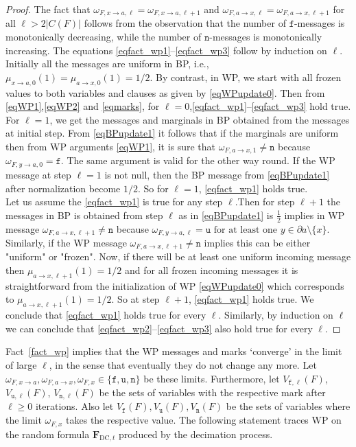 \documentclass[10pt,reqno]{amsart}
\numberwithin{equation}{section}
\renewcommand{\vec}[1]{\boldsymbol{#1}}
\newcommand{\FDC}[1]{\PHI_{\mathrm{DC},{#1}}}
\newcommand{\frozen}{\mathtt{f}}
\newcommand{\unfrozen}{\mathtt{u}}
\newcommand{\nll}{\mathtt{n}}
\newcommand{\fzn}{\frozen}
\newcommand{\uzn}{\unfrozen}
\newcommand\PHI{\vec F}
\begin{document}
\begin{proof}
	The fact that $\omega_{F,x\to a,\ell}=\omega_{F,x\to a,\ell+1}$ and $\omega_{F,a\to x,\ell}=\omega_{F,a\to x,\ell+1}$ for all $\ell>2|C(F)|$ follows from the observation that the number of $\fzn$-messages is monotonically decreasing, while the number of $\nll$-messages is monotonically increasing.
	The equations \eqref{eqfact_wp1}--\eqref{eqfact_wp3} follow by induction on $\ell$.
	Initially all the messages are uniform in BP, i.e., $\mu_{x\to a,0}(1)=\mu_{a\to x,0}(1)=1/2$. By contrast, in WP, we start with all frozen values to both variables and clauses as given by \eqref{eqWPupdate0}. 
	Then from \eqref{eqWP1},\eqref{eqWP2} and \eqref{eqmarks}, for $\ell=0$,\eqref{eqfact_wp1}--\eqref{eqfact_wp3} hold true.
		For $\ell=1$, we get the messages and marginals in BP obtained from the messages at initial step. From \eqref{eqBPupdate1} it follows that if the marginals are uniform then from WP arguments \eqref{eqWP1}, it is sure that $\omega_{F,a\to x,1}\neq \nll$ because $\omega_{F,y\to a,0}=\fzn$.
The same argument is valid for the other way round. If the WP message at step $\ell=1$ is not null, then the BP message from \eqref{eqBPupdate1} after normalization become $1/2$. So for $\ell=1$, \eqref{eqfact_wp1} holds true.\\
		Let us assume the \eqref{eqfact_wp1} is true for any step $\ell$.Then for step $\ell+1$ the messages in BP is obtained from step $\ell$ as in \eqref{eqBPupdate1} is $\frac{1}{2}$ implies in WP message $\omega_{F,a\to x,\ell+1}\neq \nll$ because $\omega_{F,y\to a,\ell}=\uzn \mbox{ for at least one }y\in\partial a\setminus\{x\}$. Similarly, if the WP message $\omega_{F,a\to x,\ell+1}\neq \nll$ implies this can be either "uniform" or "frozen". Now, if there will be at least one uniform incoming message then $\mu_{a\to x,\ell+1}(1)=1/2$ and for all frozen incoming messages it is straightforward from the initialization of WP \eqref{eqWPupdate0} which corresponds to $\mu_{a\to x,\ell+1}(1)=1/2$. So at step $\ell+1$, \eqref{eqfact_wp1} holds true.
		We conclude that \eqref{eqfact_wp1} holds true for every $\ell$. 
		Similarly, by induction on $\ell$ we can conclude that \eqref{eqfact_wp2}--\eqref{eqfact_wp3} also hold true for every $\ell$.
\end{proof}

Fact~\ref{fact_wp} implies that the WP messages and marks `converge' in the limit of large $\ell$, in the sense that eventually they do not change any more.
Let $\omega_{F,x\to a},\omega_{F,a\to x},\omega_{F,x}\in\{\fzn,\uzn,\nll\}$ be these limits.
Furthermore, let $V_{\fzn,\ell}(F)$, $V_{\uzn,\ell}(F)$, $V_{\nll,\ell}(F)$ be the sets of variables with the respective mark after $\ell\geq0$ iterations. 
Also let $V_{\fzn}(F),V_{\uzn}(F),V_{\nll}(F)$ be the sets of variables where the limit $\omega_{F,x}$ takes the respective value.
The following statement traces WP on the random formula $\FDC{t}$ produced by the decimation process.
\end{document}
